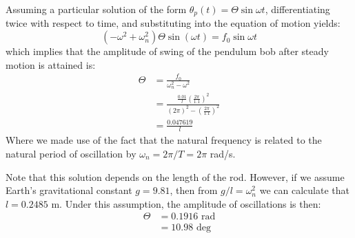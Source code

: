 \documentclass[letter, 11pt]{article}
\begin{document}
Assuming a particular solution of the form $\theta_p(t) =
\Theta\sin\omega t$, differentiating twice with respect
to time, and substituting into the equation of motion yields:
\[
(-\omega^2 + \omega_n^2)\Theta \sin\left(\omega t \right) = f_0 \sin
\omega t
\]
which implies that the amplitude of swing of the pendulum bob after steady
motion is attained is:
\begin{align*}
  \Theta &= \frac{f_0}{\omega_n^2 - \omega^2} \\
         &= \frac{\frac{0.01}{l}\left(\frac{2\pi}{1.1}\right)^2}{(2\pi)^2 -
         (\frac{2\pi}{1.1})^2} \\
         &= \frac{0.047619}{l}
\end{align*}
Where we made use of the fact that the natural frequency is related to the
natural period of oscillation by $\omega_n = 2\pi / T = 2\pi$ rad/s.

Note that this solution depends on the length of the rod.  However, if we
assume Earth's gravitational constant $g=9.81$, then from $g/l=\omega_n^2$ we
can calculate that $l = 0.2485$ m.  Under this assumption, the amplitude of
oscillations is then:
\begin{align*}
  \Theta &= 0.1916 \text{ rad}\\
         &= 10.98  \text{ deg}
\end{align*}
\end{document}
